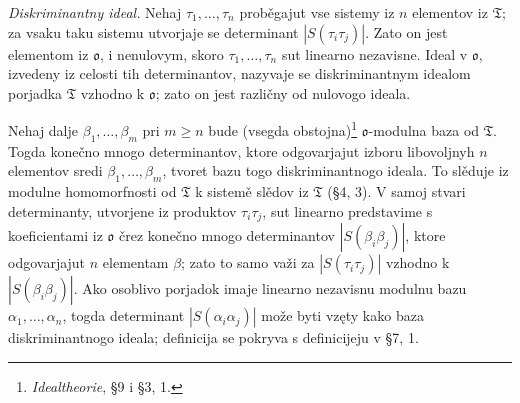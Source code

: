 \documentclass[11pt]{article}
\newcommand{\mo}{\mathfrak{o}}
\newcommand{\mT}{\mathfrak{T}}
\begin{document}
\setcounter{footnote}{34}

\noindent \emph{Diskriminantny ideal.} Nehaj $\tau_1,\ldots,\tau_n$ proběgajut vse sistemy iz $n$ elementov iz $\mT$; za vsaku taku sistemu utvorjaje se determinant $|S(\tau_i\tau_j)|$. Zato on jest elementom iz $\mo$, i nenulovym, skoro $\tau_1,\ldots,\tau_n$ sut linearno nezavisne. Ideal v $\mo$, izvedeny iz celosti tih determinantov, nazyvaje se diskriminantnym idealom porjadka $\mT$ vzhodno k $\mo$; zato on jest različny od nulovogo ideala.

Nehaj dalje $\beta_1,\ldots,\beta_m$ pri $m\ge n$ bude (vsegda obstojna)\footnote{\emph{Idealtheorie}, §9 i §3, 1.} $\mo$-modulna baza od $\mT$. Togda konečno mnogo determinantov, ktore odgovarjajut izboru libovoljnyh $n$ elementov sredi $\beta_1,\ldots,\beta_m$, tvoret bazu togo diskriminantnogo ideala. To slěduje iz modulne homomorfnosti od $\mT$ k sistemě slědov iz $\mT$ (§4, 3). V samoj stvari determinanty, utvorjene iz produktov $\tau_i\tau_j$, sut linearno predstavime s koeficientami iz $\mo$ črez konečno mnogo determinantov $|S(\beta_i\beta_j)|$, ktore odgovarjajut $n$ elementam $\beta$; zato to samo važi za $|S(\tau_i\tau_j)|$ vzhodno k $|S(\beta_i\beta_j)|$. Ako osoblivo porjadok imaje linearno nezavisnu modulnu bazu $\alpha_1,\ldots,\alpha_n$, togda determinant $|S(\alpha_i\alpha_j)|$ može byti vzęty kako baza diskriminantnogo ideala; definicija se pokryva s definicijeju v §7, 1.
\end{document}
